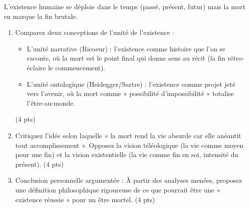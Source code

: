 \documentclass[11pt]{article}
\begin{document}
\begin{exercice}
L'existence humaine se déploie dans le temps (passé, présent, futur) mais la mort en marque la fin brutale.

\begin{enumerate}
    \item Comparez deux conceptions de l'unité de l'existence :
    \begin{itemize}
        \item L'unité narrative (Ricoeur) : l'existence comme histoire que l'on se raconte, où la mort est le point final qui donne sens au récit (la fin rétro-éclaire le commencement).
        \item L'unité ontologique (Heidegger/Sartre) : l'existence comme projet jeté vers l'avenir, où la mort comme « possibilité d'impossibilité » totalise l'être-au-monde.
    \end{itemize}
    (4 pts)
    \item Critiquez l'idée selon laquelle « la mort rend la vie absurde car elle anéantit tout accomplissement ». Opposez la vision téléologique (la vie comme moyen pour une fin) et la vision existentielle (la vie comme fin en soi, intensité du présent). (4 pts)
    \item Conclusion personnelle argumentée : À partir des analyses menées, proposez une définition philosophique rigoureuse de ce que pourrait être une « existence réussie » pour un être mortel. (4 pts)
\end{enumerate}
\end{exercice}
\end{document}
